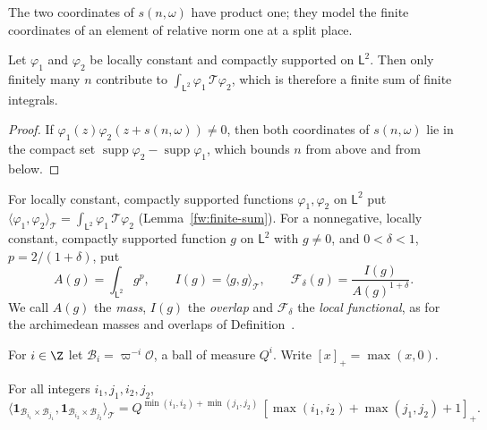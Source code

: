The two coordinates of $s(n,\omega)$ have product one; they model the
finite coordinates of an element of relative norm one at a split place.

\begin{lemma}\label{fw:finite-sum}
Let $\varphi_1$ and $\varphi_2$ be locally constant and compactly supported
on $\mathsf L^2$. Then only finitely many $n$ contribute to
$\int_{\mathsf L^2}\varphi_1\,\mathcal T\varphi_2$, which is therefore a
finite sum of finite integrals.
\end{lemma}

\begin{proof}
If $\varphi_1(z)\varphi_2(z+s(n,\omega))\ne0$, then both coordinates of
$s(n,\omega)$ lie in the compact set
$\operatorname{supp}\varphi_2-\operatorname{supp}\varphi_1$, which bounds
$n$ from above and from below.
\end{proof}

\begin{definition}\label{fw:local-functional}
For locally constant, compactly supported functions $\varphi_1,\varphi_2$ on
$\mathsf L^2$ put $\langle\varphi_1,\varphi_2\rangle_{\mathcal
T}=\int_{\mathsf L^2}\varphi_1\,\mathcal T\varphi_2$
(Lemma~\ref{fw:finite-sum}). For a nonnegative, locally constant, compactly
supported function $g$ on $\mathsf L^2$ with $g\ne0$, and $0<\delta<1$,
$p=2/(1+\delta)$, put
\begin{equation}\label{fw:functional}
 A(g)=\int_{\mathsf L^2}g^p,\qquad I(g)=\langle g,g\rangle_{\mathcal T},\qquad
 \mathcal F_\delta(g)=\frac{I(g)}{A(g)^{1+\delta}} .
\end{equation}
We call $A(g)$ the \emph{mass}, $I(g)$ the \emph{overlap} and
$\mathcal F_\delta$ the \emph{local functional}, as for the archimedean
masses and overlaps of Definition~.
\end{definition}

For $i\in\Z$ let $\mathcal B_i=\varpi^{-i}\mathcal O$, a ball of measure
$Q^i$. Write $[x]_+=\max(x,0)$.

\begin{lemma}\label{fw:gram-lemma}
For all integers $i_1,j_1,i_2,j_2$,
\begin{equation}\label{fw:rectangle-gram}
 \bigl\langle\mathbf 1_{\mathcal B_{i_1}\times\mathcal B_{j_1}},
 \mathbf 1_{\mathcal B_{i_2}\times\mathcal B_{j_2}}\bigr\rangle_{\mathcal T}
 =Q^{\min(i_1,i_2)+\min(j_1,j_2)}\,
 [\max(i_1,i_2)+\max(j_1,j_2)+1]_+.
\end{equation}
\end{lemma}

